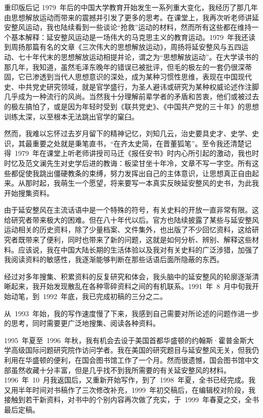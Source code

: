 \begin{pre-post-text}{重印版后记}
1979~年后的中国大学教育开始发生一系列重大变化，我经历了那几年由思想解放运动而带来的震撼并引发了更多的思考。在课堂上，我再次听老师讲延安整风运动，我也陆续看到一些谈论“抢救”运动的材料，然而所有这些都在维持一个基本解释：延安整风运动是一场伟大的马克思主义的教育运动。1979~年我还读到周扬那篇有名的文章《三次伟大的思想解放运动》，周扬将延安整风与五四运动、七十年代末的思想解放运动相提并论，谓之为“思想解放运动”。在大学读书的那几年，我知道，虽然毛泽东晚年的错误已被批评，但毛的极左的一套仍很深蒂固，它已渗透到当代人思想意识的深处，成为某种习惯性思维，表现在中国现代史、中共党史研究领域，就是官学盛行，为圣人避讳或研究为某种权威论述作注脚几乎成为一种流行的风尚。当然我十分理解前辈学者的矛盾和苦衷，他们或被过去的极左搞怕了，或是因为年轻时受到《联共党史》、《中国共产党的三十年》的思想训练太深，以至根本无法跳出官学的窠臼。

然而，我难以忘怀过去岁月留下的精神记忆，刘知几云，治史要具史才、史学、史识，其最重要之处就是秉笔直书，“在齐太史简，在晋董狐笔”。至令我还清楚记得~1979~年在课堂上听老师讲授司马迁《报任安书》时内心所引起的激动，我也时时忆及范文澜先生对史学后进的教诲：板梁甘坐十年冷，文章不写一字空。所有这些都促使我跳出僵硬教条的束缚，努力发挥出自己的主体意识，让思想真正自由起来。从那时起，我萌生一个愿望，将来要写一本真实反映延安整风的史书，为此我开始搜集资料。

由于延安整风在主流话语中是一个特殊的符号，有关史料的开放一直非常有限。这给研究者带来极大的困难。但在八十年代以后。官方也陆续披露了某些与延安整风运动相关的历史资料，除了少量档案、文件集外，也出版了不少回忆资料，这给研究者既带来了便利，同时也带来了新的问题，这就是如何分析、辨别、解释这些材料。应该说，我在中国大陆长期的生活体验以及我对有关史料的广泛涉猎，加强了我阅读资料的敏感性，我逐渐能够判断在那些话语后面所隐蔽的东西。

经过对多年搜集、积累资料的反复研究和体会，我头脑中的延安整风的轮廓逐渐清晰起来，我开始发现散乱在各种零碎资料之间的有机联系。1991~年~8~月中旬我开始动笔，到~1992~年底，我已完成初稿的三分之二。

从~1993~年始，我的写作速度慢了下来，我感到自己需要对所论述的问题作进一步的思考，同时需要更广泛地搜集、阅读各种资料。

1995~年夏至~1996~年秋，我有机会去设于美国首都华盛顿的约翰斯·霍普金斯大学高级国际问题研究院作访问学者。我在美国的研究题目与延安整风无关，但我仍利用在华盛顿的便利，在国会图书馆工作了一个月。然而很遗憾，国会图书馆中文部虽然收藏十分丰富，但是几乎找不到我所需要的有关延安整风的材料。1996~年~10~月我返国后，又重新开始写作，到了~1998~年夏，全书已经完成。我又用半年时间对书稿作了三次修改补充，1999~年初交稿后，在编辑校对阶段，我接触到若干新资料，对书中的个别内容再次做了充实，于~1999~年春夏之交，全书最后定稿。


\end{pre-post-text}
